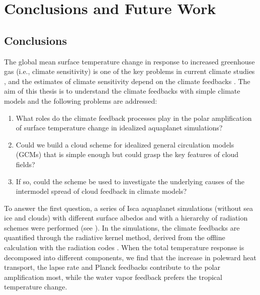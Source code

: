 \chapter{Conclusions and Future Work}
\label{ch:conclusion}

\section{Conclusions}

The global mean surface temperature change in response to increased greenhouse gas (i.e., climate sensitivity) is one of the key problems in current climate studies \citep[e.g.,][]{Bony2006,Stocker2013,Sherwood2020}, and the estimates of climate sensitivity depend on the climate feedbacks \citep{Bony2006,Soden2006}. The aim of this thesis is to understand the climate feedbacks with simple climate models and the following problems are addressed: 
\begin{enumerate}
    \item What roles do the climate feedback processes play in the polar amplification of surface temperature change in idealized aquaplanet simulations?
    \item Could we build a cloud scheme for idealized general circulation models (GCMs) that is simple enough but could grasp the key features of cloud fields?
    \item If so, could the scheme be used to investigate the underlying causes of the intermodel spread of cloud feedback in climate models? 
\end{enumerate}

To answer the first question, a series of Isca \citep{Vallis2018} aquaplanet simulations (without sea ice and clouds) with different surface albedos and with a hierarchy of radiation schemes were performed (see ). In the simulations, the climate feedbacks are quantified through the radiative kernel method, derived from the offline calculation with the radiation codes \citep{Liu2020kernel}. When the total temperature response is decomposed into different components, we find that the increase in poleward heat transport, the lapse rate and Planck feedbacks contribute to the polar amplification most, while the water vapor feedback prefers the tropical temperature change.


